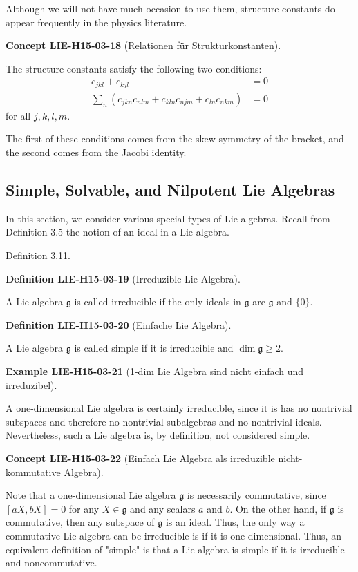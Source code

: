 \documentclass[10pt, letterpaper]{article}
\newcommand{\CustomHeading}[3]{%
  \par\medskip\noindent%
  \textbf{#1 #2} \textnormal{(#3)}.\enskip%
}
\newenvironment{DEF}[2]{\begin{unitbox}\CustomHeading{Definition}{#1}{#2}}{\end{unitbox}}
\newenvironment{EXA}[2]{\begin{unitbox}\CustomHeading{Example}{#1}{#2}}{\end{unitbox}}
\newenvironment{CONC}[2]{\begin{unitbox}\CustomHeading{Concept}{#1}{#2}}{\end{unitbox}}
\begin{document}
Although we will not have much occasion to use them, structure constants do appear frequently in the physics literature. 


\begin{CONC}{LIE-H15-03-18}{Relationen für Strukturkonstanten}
The structure constants satisfy the following two conditions:
$$
\begin{aligned}
c_{j k l}+c_{k j l} & =0 \\
\sum_{n}\left(c_{j k n} c_{n l m}+c_{k l n} c_{n j m}+c_{l n} c_{n k m}\right) & =0
\end{aligned}
$$
for all $j, k, l, m$.

The first of these conditions comes from the skew symmetry of the bracket, and the second comes from the Jacobi identity.
\end{CONC}



\subsection*{Simple, Solvable, and Nilpotent Lie Algebras}


In this section, we consider various special types of Lie algebras. Recall from Definition 3.5 the notion of an ideal in a Lie algebra.


Definition 3.11. 


\begin{DEF}{LIE-H15-03-19}{Irreduzible Lie Algebra}
A Lie algebra $\mathfrak{g}$ is called irreducible if the only ideals in $\mathfrak{g}$ are $\mathfrak{g}$ and $\{0\}$.
\end{DEF}


\begin{DEF}{LIE-H15-03-20}{Einfache Lie Algebra}
A Lie algebra $\mathfrak{g}$ is called simple if it is irreducible and $\operatorname{dim} \mathfrak{g} \geq 2$.
\end{DEF}

\begin{EXA}{LIE-H15-03-21}{1-dim Lie Algebra sind nicht einfach und irreduzibel}
A one-dimensional Lie algebra is certainly irreducible, since it is has no nontrivial subspaces and therefore no nontrivial subalgebras and no nontrivial ideals. Nevertheless, such a Lie algebra is, by definition, not considered simple.
\end{EXA}

\begin{CONC}{LIE-H15-03-22}{Einfach Lie Algebra als irreduzible nicht-kommutative Algebra}
Note that a one-dimensional Lie algebra $\mathfrak{g}$ is necessarily commutative, since $[a X, b X]=0$ for any $X \in \mathfrak{g}$ and any scalars $a$ and $b$. On the other hand, if $\mathfrak{g}$ is commutative, then any subspace of $\mathfrak{g}$ is an ideal. Thus, the only way a commutative Lie algebra can be irreducible is if it is one dimensional. Thus, an equivalent definition of "simple" is that a Lie algebra is simple if it is irreducible and noncommutative.
\end{CONC}
\end{document}
